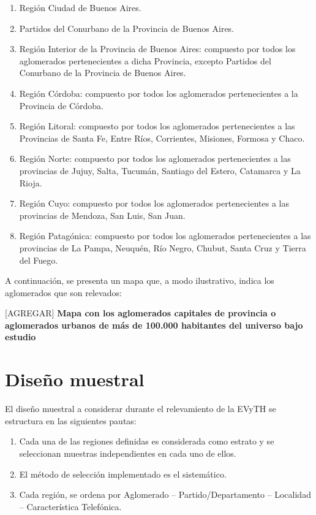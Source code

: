 \documentclass[
  openany]{book}
\begin{document}
\begin{enumerate}
\def\labelenumi{\arabic{enumi}.}
\item
  Región Ciudad de Buenos Aires.
\item
  Partidos del Conurbano de la Provincia de Buenos Aires.
\item
  Región Interior de la Provincia de Buenos Aires: compuesto por todos los aglomerados pertenecientes a dicha Provincia, excepto Partidos del Conurbano de la Provincia de Buenos Aires.
\item
  Región Córdoba: compuesto por todos los aglomerados pertenecientes a la Provincia de Córdoba.
\item
  Región Litoral: compuesto por todos los aglomerados pertenecientes a las Provincias de Santa Fe, Entre Ríos, Corrientes, Misiones, Formosa y Chaco.
\item
  Región Norte: compuesto por todos los aglomerados pertenecientes a las provincias de Jujuy, Salta, Tucumán, Santiago del Estero, Catamarca y La Rioja.
\item
  Región Cuyo: compuesto por todos los aglomerados pertenecientes a las provincias de Mendoza, San Luis, San Juan.
\item
  Región Patagónica: compuesto por todos los aglomerados pertenecientes a las provincias de La Pampa, Neuquén, Río Negro, Chubut, Santa Cruz y Tierra del Fuego.
\end{enumerate}

A continuación, se presenta un mapa que, a modo ilustrativo, indica los aglomerados que son relevados:

{[}AGREGAR{]} \textbf{Mapa con los aglomerados capitales de provincia o aglomerados urbanos de más de 100.000 habitantes del universo bajo estudio}

\hypertarget{diseuxf1o-muestral}{%
\section{Diseño muestral}\label{diseuxf1o-muestral}}

El diseño muestral a considerar durante el relevamiento de la EVyTH se estructura en las siguientes pautas:

\begin{enumerate}
\def\labelenumi{\arabic{enumi}.}
\item
  Cada una de las regiones definidas es considerada como estrato y se seleccionan muestras independientes en cada uno de ellos.
\item
  El método de selección implementado es el sistemático.
\item
  Cada región, se ordena por Aglomerado -- Partido/Departamento -- Localidad -- Característica Telefónica.
\end{enumerate}
\end{document}
